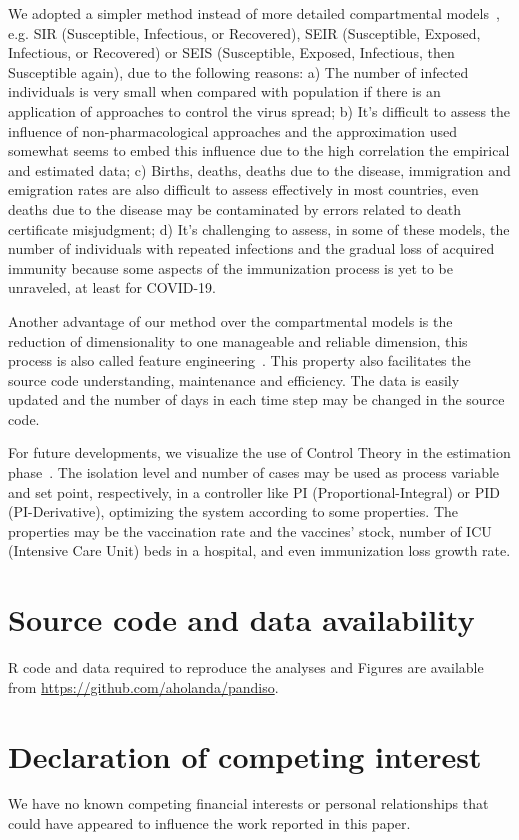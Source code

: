 \documentclass[review,3p,times]{elsarticle}
\def\covid{\hbox{COVID-19}} %
\begin{document}
We adopted a simpler method instead of more detailed 
compartmental models~\cite{Ross1916,Ross1917a,Ross1917b}, 
e.g. SIR (Susceptible, Infectious, or Recovered), SEIR (Susceptible, Exposed, Infectious, or Recovered) 
or SEIS (Susceptible, Exposed, Infectious, then Susceptible again), due to the following reasons: 
a) The number of infected individuals is very small when compared with population if there is 
    an application of approaches to control the virus spread; 
b) It's difficult to assess the influence of non-pharmacological approaches and the approximation 
    used somewhat seems to embed this influence due to the high correlation 
   the empirical and estimated data; 
c) Births, deaths, deaths due to the disease, immigration and emigration rates 
   are also difficult to assess effectively in most countries, 
   even deaths due to the disease 
   may be contaminated by errors related to death certificate misjudgment; 
d) It's challenging to assess, in some of these models, the number of 
    individuals with repeated infections and the gradual loss of acquired 
    immunity because some aspects of the immunization process is 
   yet to be unraveled, at least for \covid.

Another advantage of our method over the compartmental models is the 
 reduction of dimensionality to one manageable and reliable dimension, 
this process is also called feature engineering~\cite{Spieg2019}. 
This property also facilitates the source code 
understanding, maintenance and efficiency. 
The data is easily updated and the number of days in each time step 
may be changed in the source code.

For future developments, we visualize the use of Control Theory 
in the estimation phase~\cite{Stewart2020}. 
The isolation level and number of cases 
may be used as process variable and set point, respectively, 
in a controller like PI (Proportional-Integral) or PID (PI-Derivative), 
optimizing the system according to some properties. 
The properties may be the vaccination rate and the vaccines’ stock, 
number of ICU (Intensive Care Unit) beds in a hospital, 
and even immunization loss growth rate.

\section*{Source code and data availability}
R code and data required to reproduce the analyses 
and Figures are available from
\url{https://github.com/aholanda/pandiso}.

\section*{Declaration of competing interest}
We have no known 
competing financial interests or personal 
relationships that could have
appeared to influence the work 
reported in this paper.


\end{document}
